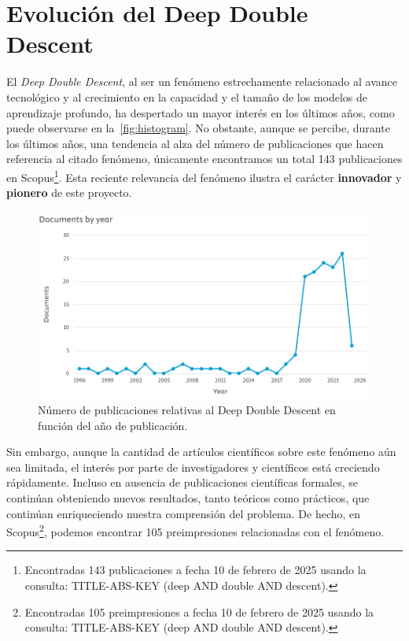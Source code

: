 
\chapter{Evolución del Deep Double Descent}\label{sec:evolucion-ddd}

El \emph{Deep Double Descent}, al ser un fenómeno estrechamente relacionado al avance tecnológico y al crecimiento en la capacidad y el tamaño de los modelos de aprendizaje profundo, ha despertado un mayor interés en los últimos años, como puede observarse en la~\autoref{fig:histogram}. No obstante, aunque se percibe, durante los últimos años, una tendencia al alza del número de publicaciones que hacen referencia al citado fenómeno, únicamente encontramos un total 143 publicaciones en Scopus\footnote{Encontradas 143 publicaciones a fecha 10 de febrero de 2025 usando la consulta: TITLE-ABS-KEY (deep AND double AND descent).}. Esta reciente relevancia del fenómeno ilustra el carácter \textbf{innovador} y \textbf{pionero} de este proyecto.\newline

\begin{figure}[h]
    \centering
    \includegraphics[width=0.8\linewidth]{img/scopus_histogram.png}
    \caption[Número de publicaciones relativas al Deep Double Descent (ir actualizando histograma de cara a nuevos papers).] {Número de publicaciones relativas al Deep Double Descent en función del año de publicación.}\label{fig:histogram}
\end{figure}

Sin embargo, aunque la cantidad de artículos científicos sobre este fenómeno aún sea limitada, el interés por parte de investigadores y científicos está creciendo rápidamente. Incluso en ausencia de publicaciones científicas formales, se continúan obteniendo nuevos resultados, tanto teóricos como prácticos, que continúan enriqueciendo nuestra comprensión del problema. De hecho, en Scopus\footnote{Encontradas 105 preimpresiones a fecha 10 de febrero de 2025 usando la consulta: TITLE-ABS-KEY (deep AND double AND descent).}, podemos encontrar 105 preimpresiones relacionadas con el fenómeno.\newline

